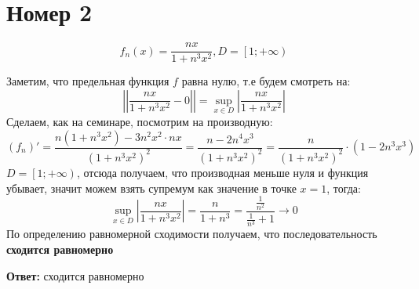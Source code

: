\documentclass[a4paper,12pt]{article}
\begin{document}
\section*{Номер 2}
\[
f_n(x) = \frac{nx}{1 + n^3x^2}, D = \left[1; + \infty \right)
\]

Заметим, что предельная функция $f$ равна нулю, т.е будем смотреть на:
\[
\left| \left|\frac{nx}{1+n^3x^2}- 0\right| \right|  = \underset{x \in D}{\sup} \left| \frac{nx}{1+n^3x^2}\right|
\]
Сделаем, как на семинаре, посмотрим на производную:
\[
(f_n)' =  \frac{n(1 + n^3x^2) - 3n^2x^2 \cdot nx}{(1+n^3x^2)^2} = \frac{n - 2n^4x^3}{(1+n^3x^2)^2} = \frac{n}{(1+n^3x^2)^2} \cdot (1 -2n^3x^3) 
\]
$D =  \left[1; + \infty \right)$, отсюда получаем, что производная меньше нуля и функция убывает, значит можем взять супремум как значение в точке $x = 1$, тогда:
\[
\underset{x \in D}{\sup} \left| \frac{nx}{1+n^3x^2}\right| = \frac{n}{1 + n^3} = \frac{\frac{1}{n^2}}{\frac{1}{n^3} + 1 } \rightarrow 0
\]
По определению равномерной сходимости получаем, что последовательность \textbf{сходится равномерно}
\begin{center}
\textbf{Ответ: } сходится равномерно

\end{center}
\end{document}
